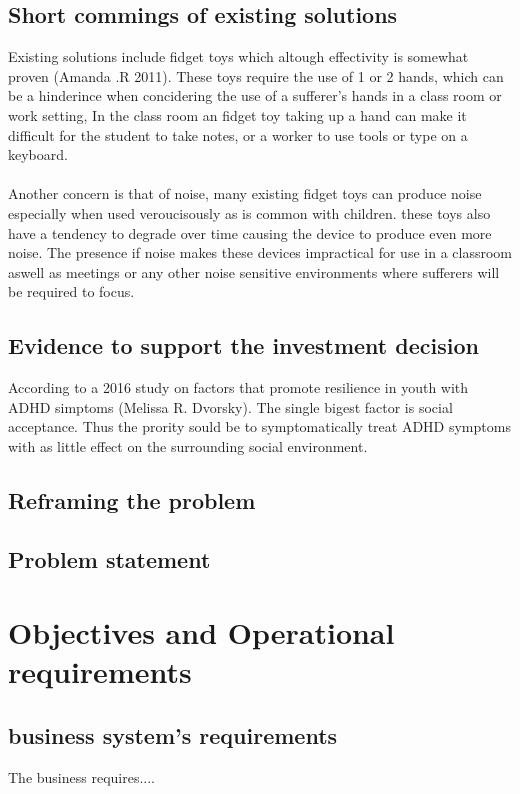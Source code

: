 \documentclass{article}
\begin{document}
    \subsection{Short commings of existing solutions}
      Existing solutions include fidget toys which altough effectivity is
      somewhat proven (Amanda .R 2011). These toys require the use of 1 or 2 hands, which can be
      a hinderince when concidering the use of a sufferer's hands in a class
      room or work setting, In the class room an fidget toy taking up a hand can
      make it difficult for the student to take notes, or a worker to use tools
      or type on a keyboard. \\ \\
      Another concern is that of noise, many existing fidget toys can produce
      noise especially when used veroucisously as is common with children.
      these toys also have a tendency to degrade over time causing the device to
      produce even more noise. The presence if noise makes these devices
      impractical for use in a classroom aswell as meetings or any other noise
      sensitive environments where sufferers will be required to focus.


    \subsection{Evidence to support the investment decision}
      According to a 2016 study on factors that promote resilience in youth with
      ADHD simptoms (Melissa R. Dvorsky). The single bigest factor is social
      acceptance. Thus the prority sould be to symptomatically treat ADHD
      symptoms with as little effect on the surrounding social environment.
      

    \subsection{Reframing the problem}

    \subsection{Problem statement}


  \newpage{}
  \section{Objectives and Operational requirements}
    \subsection{business system's requirements}
      The business requires....
    
\end{document}
